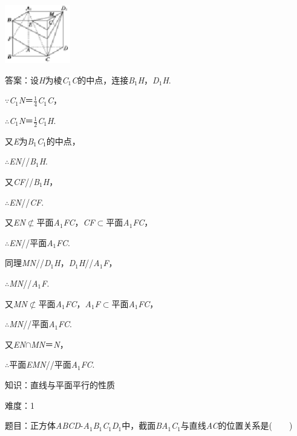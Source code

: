 \documentclass{article} %
\begin{document}
\includegraphics*[width=1.12in, height=1.00in, keepaspectratio=false]{image157}

答案：设\textit{H}为棱\textit{C}${}_{1}$\textit{C}的中点，连接\textit{B}${}_{1}$\textit{H}，\textit{D}${}_{1}$\textit{H}.

$\mathrm{\because}$\textit{C}${}_{1}$\textit{N}＝$\frac{1}{4}$\textit{C}${}_{1}$\textit{C}，

$\mathrm{\therefore}$\textit{C}${}_{1}$\textit{N}＝$\frac{1}{2}$\textit{C}${}_{1}$\textit{H}.

又\textit{E}为\textit{B}${}_{1}$\textit{C}${}_{1}$的中点，

$\mathrm{\therefore}$\textit{EN}//\textit{B}${}_{1}$\textit{H}.

又\textit{CF}//\textit{B}${}_{1}$\textit{H}，

$\mathrm{\therefore}$\textit{EN}//\textit{CF}.

又\textit{EN}$\mathrm{\nsubset}$平面\textit{A}${}_{1}$\textit{FC}，\textit{CF}$\mathrm{\subset }$平面\textit{A}${}_{1}$\textit{FC}，

$\mathrm{\therefore}$\textit{EN}//平面\textit{A}${}_{1}$\textit{FC}.

同理\textit{MN}//\textit{D}${}_{1}$\textit{H}，\textit{D}${}_{1}$\textit{H}//\textit{A}${}_{1}$\textit{F}，

$\mathrm{\therefore}$\textit{MN}//\textit{A}${}_{1}$\textit{F}.

又\textit{MN}$\mathrm{\nsubset}$平面\textit{A}${}_{1}$\textit{FC}，\textit{A}${}_{1}$\textit{F}$\mathrm{\subset }$平面\textit{A}${}_{1}$\textit{FC}，

$\mathrm{\therefore}$\textit{MN}//平面\textit{A}${}_{1}$\textit{FC}.

又\textit{EN}$\mathrm{\cap}$\textit{MN}＝\textit{N}，

$\mathrm{\therefore}$平面\textit{EMN}//平面\textit{A}${}_{1}$\textit{FC}.

知识：直线与平面平行的性质

难度：1

题目：正方体\textit{ABCD}-\textit{A}${}_{1}$\textit{B}${}_{1}$\textit{C}${}_{1}$\textit{D}${}_{1}$中，截面\textit{BA}${}_{1}$\textit{C}${}_{1}$与直线\textit{AC}的位置关系是(　　)
\end{document}
